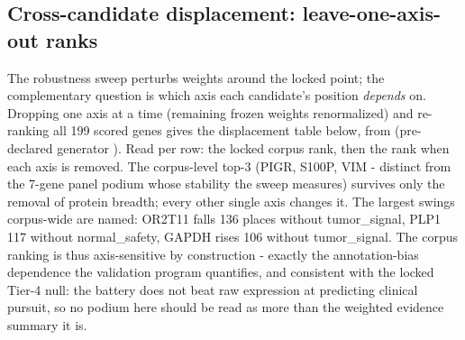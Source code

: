 \subsection{Cross-candidate displacement: leave-one-axis-out ranks}
{\sloppy The robustness sweep perturbs weights around the locked point; the complementary question is which axis each candidate's position \emph{depends} on. Dropping one axis at a time (remaining frozen weights renormalized) and re-ranking all 199 scored genes gives the displacement table below, from  (pre-declared generator ). Read per row: the locked corpus rank, then the rank when each axis is removed. The corpus-level top-3 (PIGR, S100P, VIM - distinct from the 7-gene panel podium whose stability the sweep measures) survives only the removal of protein breadth; every other single axis changes it. The largest swings corpus-wide are named: OR2T11 falls 136 places without tumor\_signal, PLP1 117 without normal\_safety, GAPDH rises 106 without tumor\_signal. The corpus ranking is thus axis-sensitive by construction - exactly the annotation-bias dependence the validation program quantifies, and consistent with the locked Tier-4 null: the battery does not beat raw expression at predicting clinical pursuit, so no podium here should be read as more than the weighted evidence summary it is.\par}
